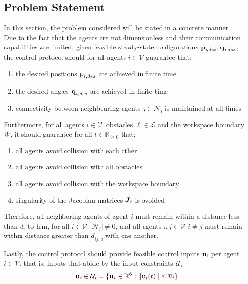 \subsection{Problem Statement}

In this section, the problem considered will be stated in a concrete manner.\\

Due to the fact that the agents are not dimensionless and their communication
capabilities are limited, given feasible steady-state configurations
$\bm{\mathbf{p}}_{i,des}, \bm{\mathbf{q}}_{i,des}$, the control protocol should for all
agents $i \in \mathcal{V}$ guarantee that:
\begin{enumerate}
  \item the desired positions $\bm{\mathbf{p}}_{i,des}$ are achieved in finite time
  \item the desired angles $\bm{\mathbf{q}}_{i,des}$ are achieved in finite time
  \item connectivity between neighbouring agents $j \in \mathcal{N}_i$ is
    maintained at all times
\end{enumerate}
Furthermore, for all agents $i \in \mathcal{V}$, obstacles $\ell \in \mathcal{L}$
and the workspace boundary $W$, it should guarantee for all
$t\in\mathbb{R}_{\geq 0}$ that:
\begin{enumerate}
  \item all agents avoid collision with each other
  \item all agents avoid collision with all obstacles
  \item all agents avoid collision with the workspace boundary
  \item singularity of the Jacobian matrices $\bm{\mathit{J}}_i$ is avoided
\end{enumerate}

Therefore, all neighboring agents of agent $i$ must remain within a distance
less than $d_i$ to him, for all $i \in \mathcal{V}: |\mathcal{N}_i| \not= 0$,
and all agents $i, j\in \mathcal{V}, i \neq j$ must remain within distance
greater than $\underline{d}_{ij,a}$ with one another.

Lastly, the control protocol should provide feasible control inputs $\bm{\mathbf{u}}_i$
per agent $i \in \mathcal{V}$, that is, inputs that abide by the input
constraints $\mathcal{U}_i$
\begin{align}
\bm{\mathbf{u}}_i \in \mathcal{U}_i = \{ \bm{\mathbf{u}}_i \in \mathbb{R}^6 :
        \|\bm{\mathbf{u}}_i (t)\| \leq \overline{u}_i\}
\end{align}

